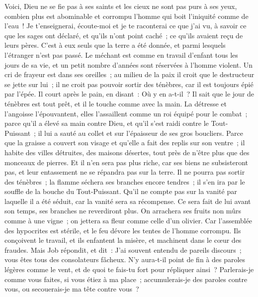 \begin{multicols}{2}
Voici, Dieu ne se fie pas à ses saints et les cieux ne sont pas purs à ses yeux,
combien plus est abominable et corrompu l'homme qui boit l'iniquité comme de l'eau~! 
Je t'enseignerai, écoute-moi et je te raconterai ce que j'ai vu,
à savoir ce que les sages ont déclaré, et qu'ils n'ont point caché~; ce qu'ils avaient reçu de leurs pères.
C'est à eux seuls que la terre a été donnée, et parmi lesquels l'étranger n'est pas passé.
Le méchant est comme en travail d'enfant tous les jours de sa vie, et un petit nombre d'années sont réservées à l'homme violent.
Un cri de frayeur est dans ses oreilles~; au milieu de la paix il croit que le destructeur se jette sur lui~;
il ne croit pas pouvoir sortir des ténèbres, car il est toujours épié par l'épée.
Il court après le pain, en disant~: Où y en a-t-il~? Il sait que le jour de ténèbres est tout prêt, et il le touche comme avec la main.
La détresse et l'angoisse l'épouvantent, elles l'assaillent comme un roi équipé pour le combat~;
parce qu'il a élevé sa main contre Dieu, et qu'il s'est raidi contre le Tout-Puissant~;
il lui a sauté au collet et sur l'épaisseur de ses gros boucliers. 
Parce que la graisse a couvert son visage et qu'elle a fait des replis sur son ventre~;
 il habite des villes détruites, des maisons désertes, tout près de n'être plus que des monceaux de pierres. 
Et il n'en sera pas plus riche, car ses biens ne subsisteront pas, et leur entassement ne se répandra pas sur la terre.
Il ne pourra pas sortir des ténèbres~; la flamme séchera ses branches encore tendres~; il s'en ira par le souffle de la bouche du Tout-Puissant.
Qu'il ne compte pas sur la vanité par laquelle il a été séduit, car la vanité sera sa récompense.
Ce sera fait de lui avant son temps, ses branches ne reverdiront plus. 
On arrachera ses fruits non mûrs comme à une vigne~; on jettera sa fleur comme celle d'un olivier. 
Car l'assemblée des hypocrites est stérile, et le feu dévore les tentes de l'homme corrompu.
Ils conçoivent le travail, et ils enfantent la misère, et machinent dans le cœur des fraudes.
\VerseOne{}Mais Job répondit, et dit~:
J'ai souvent entendu de pareils discours~; vous êtes tous des consolateurs fâcheux.
N'y aura-t-il point de fin à des paroles légères comme le vent, et de quoi te fais-tu fort pour répliquer ainsi~?
Parlerais-je comme vous faites, si vous étiez à ma place~; accumulerais-je des paroles contre vous, ou secouerais-je ma tête contre vous~? 

\end{multicols}
